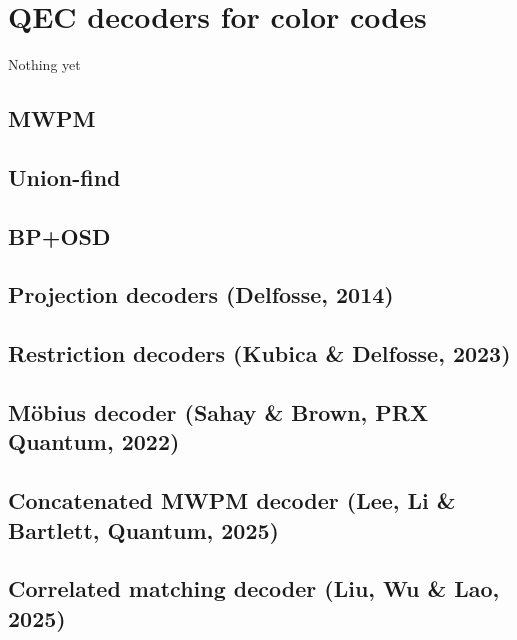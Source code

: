 \chapter{QEC decoders for color codes}
\label{chap:quec_decoders}

Nothing yet
\section{MWPM}

\section{Union-find}

\section{BP+OSD}

\section{Projection decoders (Delfosse, 2014)}

\section{Restriction decoders (Kubica \& Delfosse, 2023)}

\section{Möbius decoder (Sahay \& Brown, PRX Quantum, 2022)}

\section{Concatenated MWPM decoder (Lee, Li \& Bartlett, Quantum, 2025)}

\section{Correlated matching decoder (Liu, Wu \& Lao, 2025)}
